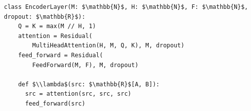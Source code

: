 \documentclass[border=10pt]{standalone}
\begin{document}
\begin{lstlisting}
class EncoderLayer(M: $\mathbb{N}$, H: $\mathbb{N}$, F: $\mathbb{N}$, dropout: $\mathbb{R}$):
    Q = K = max(M // H, 1)
    attention = Residual(
        MultiHeadAttention(H, M, Q, K), M, dropout)
    feed_forward = Residual(
        FeedForward(M, F), M, dropout)

    def $\\lambda$(src: $\mathbb{R}$[A, B]):
      src = attention(src, src, src)
      feed_forward(src)
\end{lstlisting}
\end{document}
